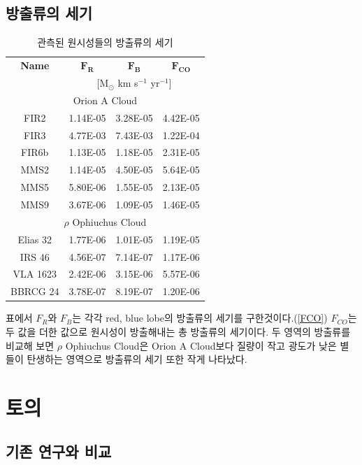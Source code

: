 \subsection{방출류의 세기}
\begin{table}[h]
	\begin{center}
		\begin{tabular}{c|c|c|c}
			\toprule
			\textbf{Name} &$\mathbf{F_{R}}$ & $\mathbf{F_{B}}$ & $\mathbf{F_{CO}}$\\
			& \multicolumn{3}{c}{[M$_{\odot}$ km s$^{-1}$ yr$^{-1}$]}\\
			\midrule
			\multicolumn{4}{c}{Orion A Cloud}\\
			\midrule
			FIR2 & 1.14E-05 & 3.28E-05 & 4.42E-05\\
			FIR3 & 4.77E-03 & 7.43E-03 & 1.22E-04\\
			FIR6b & 1.13E-05 & 1.18E-05 & 2.31E-05\\
			MMS2 & 1.14E-05 & 4.50E-05 & 5.64E-05\\
			MMS5 & 5.80E-06 & 1.55E-05 & 2.13E-05\\
			MMS9 & 3.67E-06 & 1.09E-05 & 1.46E-05\\
			\midrule
			\multicolumn{4}{c}{$\rho$ Ophiuchus Cloud}\\
			\midrule
			Elias 32 & 1.77E-06 & 1.01E-05 & 1.19E-05\\
			IRS 46 & 4.56E-07 & 7.14E-07 & 1.17E-06\\
			VLA 1623 & 2.42E-06 & 3.15E-06 & 5.57E-06\\
			BBRCG 24 & 3.78E-07 & 8.19E-07 & 1.20E-06\\
		\end{tabular}
	\end{center}
	\caption{관측된 원시성들의 방출류의 세기}
\end{table}

표에서 $F_R$와 $F_B$는 각각 red, blue lobe의 방출류의 세기를 구한것이다.(\ref{FCO}) $F_{CO}$는 두 값을 더한 값으로 원시성이 방출해내는 총 방출류의 세기이다. 두 영역의 방출류를 비교해 보면 $\rho$ Ophiuchus Cloud은 Orion A Cloud보다 질량이 작고 광도가 낮은 별들이 탄생하는 영역으로 방출류의 세기 또한 작게 나타났다.\\

\section{토의}

\subsection{기존 연구와 비교}


